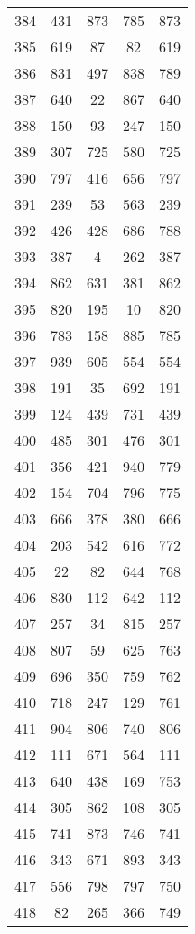 \documentclass[a4paper,10pt,ngerman]{scrartcl}
\begin{document}
\begin{longtable}[c]{c|c|c|c|c}
    384 & 431 & 873 & 785 & 873 \\
    385 & 619 & 87 & 82 & 619 \\
    386 & 831 & 497 & 838 & 789 \\
    387 & 640 & 22 & 867 & 640 \\
    388 & 150 & 93 & 247 & 150 \\
    389 & 307 & 725 & 580 & 725 \\
    390 & 797 & 416 & 656 & 797 \\
    391 & 239 & 53 & 563 & 239 \\
    392 & 426 & 428 & 686 & 788 \\
    393 & 387 & 4 & 262 & 387 \\
    394 & 862 & 631 & 381 & 862 \\
    395 & 820 & 195 & 10 & 820 \\
    396 & 783 & 158 & 885 & 785 \\
    397 & 939 & 605 & 554 & 554 \\
    398 & 191 & 35 & 692 & 191 \\
    399 & 124 & 439 & 731 & 439 \\
    400 & 485 & 301 & 476 & 301 \\
    401 & 356 & 421 & 940 & 779 \\
    402 & 154 & 704 & 796 & 775 \\
    403 & 666 & 378 & 380 & 666 \\
    404 & 203 & 542 & 616 & 772 \\
    405 & 22 & 82 & 644 & 768 \\
    406 & 830 & 112 & 642 & 112 \\
    407 & 257 & 34 & 815 & 257 \\
    408 & 807 & 59 & 625 & 763 \\
    409 & 696 & 350 & 759 & 762 \\
    410 & 718 & 247 & 129 & 761 \\
    411 & 904 & 806 & 740 & 806 \\
    412 & 111 & 671 & 564 & 111 \\
    413 & 640 & 438 & 169 & 753 \\
    414 & 305 & 862 & 108 & 305 \\
    415 & 741 & 873 & 746 & 741 \\
    416 & 343 & 671 & 893 & 343 \\
    417 & 556 & 798 & 797 & 750 \\
    418 & 82 & 265 & 366 & 749 \\

\end{longtable}
\end{document}
